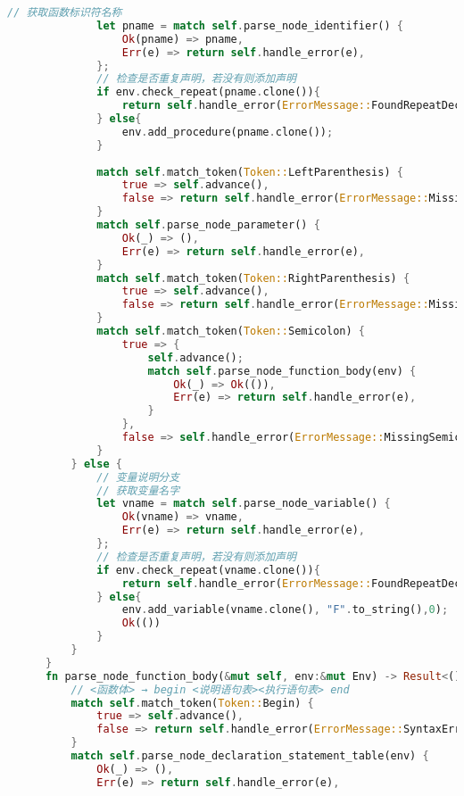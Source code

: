 \begin{lstlisting}[caption={语法分析器parse.rs}, label={4:code-example}, captionpos=t, language=rust]
              // 获取函数标识符名称
              let pname = match self.parse_node_identifier() {
                  Ok(pname) => pname,
                  Err(e) => return self.handle_error(e),
              };
              // 检查是否重复声明，若没有则添加声明
              if env.check_repeat(pname.clone()){
                  return self.handle_error(ErrorMessage::FoundRepeatDeclarationInThisField);
              } else{
                  env.add_procedure(pname.clone());
              }
  
              match self.match_token(Token::LeftParenthesis) {
                  true => self.advance(),
                  false => return self.handle_error(ErrorMessage::MissingLeftParenthesis)
              }
              match self.parse_node_parameter() {
                  Ok(_) => (),
                  Err(e) => return self.handle_error(e),
              }
              match self.match_token(Token::RightParenthesis) {
                  true => self.advance(),
                  false => return self.handle_error(ErrorMessage::MissingRightParenthesis)
              }
              match self.match_token(Token::Semicolon) {
                  true => {
                      self.advance();
                      match self.parse_node_function_body(env) {
                          Ok(_) => Ok(()),
                          Err(e) => return self.handle_error(e),
                      }
                  },
                  false => self.handle_error(ErrorMessage::MissingSemicolon),
              }
          } else {
              // 变量说明分支
              // 获取变量名字
              let vname = match self.parse_node_variable() {
                  Ok(vname) => vname,
                  Err(e) => return self.handle_error(e),
              };
              // 检查是否重复声明，若没有则添加声明
              if env.check_repeat(vname.clone()){
                  return self.handle_error(ErrorMessage::FoundRepeatDeclarationInThisField);
              } else{
                  env.add_variable(vname.clone(), "F".to_string(),0);
                  Ok(())
              }
          }
      }
      fn parse_node_function_body(&mut self, env:&mut Env) -> Result<(), ErrorMessage>{
          // <函数体> → begin <说明语句表><执行语句表> end
          match self.match_token(Token::Begin) {
              true => self.advance(),
              false => return self.handle_error(ErrorMessage::SyntaxErrorExpectedABlock)
          }
          match self.parse_node_declaration_statement_table(env) {
              Ok(_) => (),
              Err(e) => return self.handle_error(e),

\end{lstlisting}
